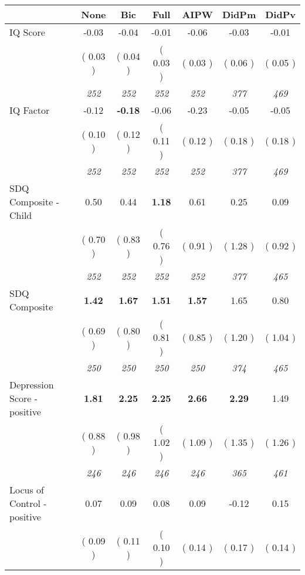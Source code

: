 \begin{tabular}{l c c c c c c}
\toprule
 & None & Bic & Full & AIPW & DidPm & DidPv \\
\midrule
IQ Score &     -0.03 &     -0.04 &     -0.01 &     -0.06 &     -0.03 &     -0.01 \\
& (     0.03 ) & (     0.04 ) & (     0.03 ) & (     0.03 ) & (     0.06 ) & (     0.05 ) \\
& \textit{ 252 } & \textit{ 252 } & \textit{ 252 } & \textit{ 252 } & \textit{ 377 } & \textit{ 469 } \\
IQ Factor &     -0.12 & \textbf{     -0.18 } &     -0.06 &     -0.23 &     -0.05 &     -0.05 \\
& (     0.10 ) & (     0.12 ) & (     0.11 ) & (     0.12 ) & (     0.18 ) & (     0.18 ) \\
& \textit{ 252 } & \textit{ 252 } & \textit{ 252 } & \textit{ 252 } & \textit{ 377 } & \textit{ 469 } \\
SDQ Composite - Child &      0.50 &      0.44 & \textbf{      1.18 } &      0.61 &      0.25 &      0.09 \\
& (     0.70 ) & (     0.83 ) & (     0.76 ) & (     0.91 ) & (     1.28 ) & (     0.92 ) \\
& \textit{ 252 } & \textit{ 252 } & \textit{ 252 } & \textit{ 252 } & \textit{ 377 } & \textit{ 465 } \\
SDQ Composite & \textbf{      1.42 } & \textbf{      1.67 } & \textbf{      1.51 } & \textbf{     1.57} &      1.65 &      0.80 \\
& (     0.69 ) & (     0.80 ) & (     0.81 ) & (     0.85 ) & (     1.20 ) & (     1.04 ) \\
& \textit{ 250 } & \textit{ 250 } & \textit{ 250 } & \textit{ 250 } & \textit{ 374 } & \textit{ 465 } \\
Depression Score - positive & \textbf{      1.81 } & \textbf{      2.25 } & \textbf{      2.25 } & \textbf{     2.66} & \textbf{      2.29 } &      1.49 \\
& (     0.88 ) & (     0.98 ) & (     1.02 ) & (     1.09 ) & (     1.35 ) & (     1.26 ) \\
& \textit{ 246 } & \textit{ 246 } & \textit{ 246 } & \textit{ 246 } & \textit{ 365 } & \textit{ 461 } \\
Locus of Control - positive &      0.07 &      0.09 &      0.08 &      0.09 &     -0.12 &      0.15 \\
& (     0.09 ) & (     0.11 ) & (     0.10 ) & (     0.14 ) & (     0.17 ) & (     0.14 ) \\

\end{tabular}
